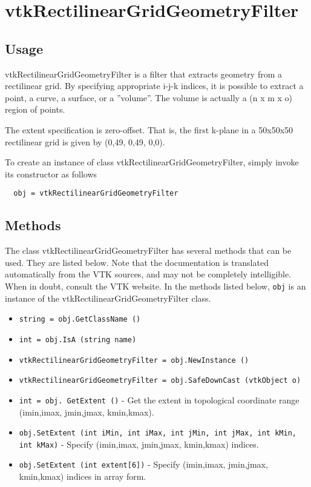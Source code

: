 \section{vtkRectilinearGridGeometryFilter}

\subsection{Usage}

 vtkRectilinearGridGeometryFilter is a filter that extracts geometry from a
 rectilinear grid. By specifying appropriate i-j-k indices, it is possible
 to extract a point, a curve, a surface, or a ''volume''. The volume
 is actually a (n x m x o) region of points.

 The extent specification is zero-offset. That is, the first k-plane in
 a 50x50x50 rectilinear grid is given by (0,49, 0,49, 0,0).

To create an instance of class vtkRectilinearGridGeometryFilter, simply
invoke its constructor as follows
\begin{verbatim}
  obj = vtkRectilinearGridGeometryFilter
\end{verbatim}
\subsection{Methods}

The class vtkRectilinearGridGeometryFilter has several methods that can be used.
  They are listed below.
Note that the documentation is translated automatically from the VTK sources,
and may not be completely intelligible.  When in doubt, consult the VTK website.
In the methods listed below, \verb|obj| is an instance of the vtkRectilinearGridGeometryFilter class.
\begin{itemize}
\item  \verb|string = obj.GetClassName ()|

\item  \verb|int = obj.IsA (string name)|

\item  \verb|vtkRectilinearGridGeometryFilter = obj.NewInstance ()|

\item  \verb|vtkRectilinearGridGeometryFilter = obj.SafeDownCast (vtkObject o)|

\item  \verb|int = obj. GetExtent ()| -  Get the extent in topological coordinate range (imin,imax, jmin,jmax,
 kmin,kmax).

\item  \verb|obj.SetExtent (int iMin, int iMax, int jMin, int jMax, int kMin, int kMax)| -  Specify (imin,imax, jmin,jmax, kmin,kmax) indices.

\item  \verb|obj.SetExtent (int extent[6])| -  Specify (imin,imax, jmin,jmax, kmin,kmax) indices in array form.

\end{itemize}
